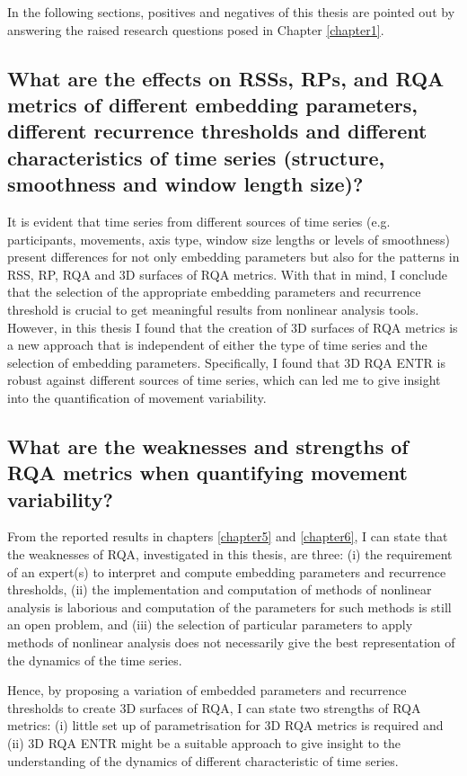 In the following sections, positives and negatives of this thesis 
are pointed out by answering the raised research questions 
posed in Chapter \ref{chapter1}.

\subsection*{
	What are the effects on RSSs, RPs, and RQA metrics
	of different embedding parameters, different recurrence thresholds 
	and different characteristics of time series 
	(structure, smoothness and window length size)?
}
It is evident that time series from different sources 
of time series (e.g. participants, movements, axis type, window size lengths 
or levels of smoothness) present differences for not only
embedding parameters but also for the patterns in RSS, RP, RQA 
and 3D surfaces of RQA metrics.
With that in mind, I conclude that the selection of the appropriate
embedding parameters and recurrence threshold is crucial to get 
meaningful results from nonlinear analysis tools. However, in this 
thesis I found that the creation of 3D surfaces of RQA metrics is 
a new approach that is independent of either the type of time series
and the selection of embedding parameters. 
Specifically, I found that 3D RQA ENTR is robust against different 
sources of time series, which can led me to give insight into the 
quantification of movement variability. 

\subsection*{What are the weaknesses and strengths of RQA metrics 
	when quantifying movement variability?}

From the reported results in chapters 
\ref{chapter5} and \ref{chapter6}, I can state that the 
weaknesses of RQA, investigated in this thesis, are three:  
(i) the requirement of an expert(s) 
to interpret and compute embedding parameters and 
recurrence thresholds,  
(ii) the implementation and computation of methods of 
nonlinear analysis is laborious and computation of the parameters 
for such methods is still an open problem, and 
(iii) the selection of particular parameters to apply 
methods of nonlinear analysis does not necessarily give 
the best representation of the dynamics of the time series.

Hence, by proposing a variation of embedded parameters and recurrence 
thresholds to create 3D surfaces of RQA, I can state two strengths of 
RQA metrics:  
(i) little set up of parametrisation for 3D RQA metrics is required and 
(ii) 3D RQA ENTR might be a suitable approach to give insight 
to the understanding of the dynamics of different 
characteristic of time series.

